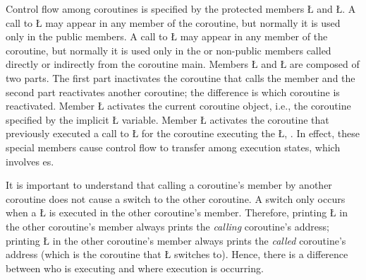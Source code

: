 \documentclass[openright,twoside]{report}
\begin{document}
\enlargethispage{15pt}
Control flow among coroutines is specified by the protected members \LGinlinetrue\LGbegin\lgrinde\L{}\endlgrinde\LGend{} and \LGinlinetrue\LGbegin\lgrinde\L{}\endlgrinde\LGend{}.
A call to \LGinlinetrue\LGbegin\lgrinde\L{}\endlgrinde\LGend{} may appear in any member of the coroutine, but normally it is used only in the public members.
A call to \LGinlinetrue\LGbegin\lgrinde\L{}\endlgrinde\LGend{} may appear in any member of the coroutine, but normally it is used only in the  or non-public members called directly or indirectly from the coroutine main.
Members \LGinlinetrue\LGbegin\lgrinde\L{}\endlgrinde\LGend{} and \LGinlinetrue\LGbegin\lgrinde\L{}\endlgrinde\LGend{} are composed of two parts.
The first part inactivates the coroutine that calls the member and the second part reactivates another coroutine;
the difference is which coroutine is reactivated.
Member \LGinlinetrue\LGbegin\lgrinde\L{}\endlgrinde\LGend{} activates the current coroutine object, i.e., the coroutine specified by the implicit \LGinlinetrue\LGbegin\lgrinde\L{}\endlgrinde\LGend{} variable.
Member \LGinlinetrue\LGbegin\lgrinde\L{}\endlgrinde\LGend{} activates the coroutine that previously executed a call to \LGinlinetrue\LGbegin\lgrinde\L{}\endlgrinde\LGend{} for the coroutine executing the \LGinlinetrue\LGbegin\lgrinde\L{}\endlgrinde\LGend{}, .
In effect, these special members cause control flow to transfer among execution states, which involves es.

It is important to understand that calling a coroutine's member by another coroutine does not cause a switch to the other coroutine.
A switch only occurs when a \LGinlinetrue\LGbegin\lgrinde\L{}\endlgrinde\LGend{} is executed in the other coroutine's member.
Therefore, printing \LGinlinetrue\LGbegin\lgrinde\L{}\endlgrinde\LGend{} in the other coroutine's member always prints the \emph{calling} coroutine's address;
printing \LGinlinetrue\LGbegin\lgrinde\L{}\endlgrinde\LGend{} in the other coroutine's member always prints the \emph{called} coroutine's address (which is the coroutine that \LGinlinetrue\LGbegin\lgrinde\L{}\endlgrinde\LGend{} switches to).
Hence, there is a difference between who is executing and where execution is occurring.
\end{document}
